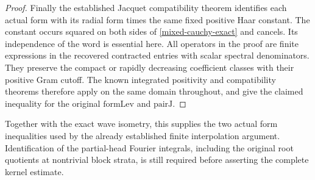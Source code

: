 \begin{proof}
Finally the established Jacquet compatibility theorem identifies
each actual form with its radial form times the same fixed
positive Haar constant.  The constant occurs squared on both
sides of \eqref{mixed-cauchy-exact} and cancels.  Its independence
of the word is essential here.  All operators in the proof are
finite expressions in the recovered contracted entries with
scalar spectral denominators.  They preserve the compact or
rapidly decreasing coefficient classes with their positive Gram
cutoff.  The known integrated positivity and compatibility theorems
therefore apply on the same domain throughout, and give the claimed
inequality for the original $\mathrm{formLev}$ and $\mathrm{pairJ}$.
\end{proof}

Together with the exact wave isometry, this supplies the two
actual form inequalities used by the already established finite
interpolation argument.  Identification of the partial-head
Fourier integrals, including the original root quotients at
nontrivial block strata, is still required before asserting the
complete kernel estimate.
